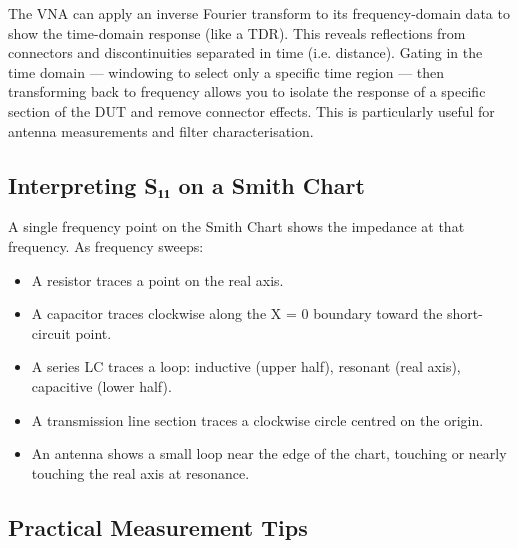       

The VNA can apply an inverse Fourier transform to its frequency-domain data to show the time-domain response (like a TDR). This reveals reflections from connectors and discontinuities separated in time (i.e. distance). Gating in the time domain — windowing to select only a specific time region — then transforming back to frequency allows you to isolate the response of a specific section of the DUT and remove connector effects. This is particularly useful for antenna measurements and filter characterisation.

      

\subsection{Interpreting S₁₁ on a Smith Chart}

      

A single frequency point on the Smith Chart shows the impedance at that frequency. As frequency sweeps:

      
\begin{itemize}

        \item A resistor traces a point on the real axis.

        \item A capacitor traces clockwise along the X = 0 boundary toward the short-circuit point.

        \item A series LC traces a loop: inductive (upper half), resonant (real axis), capacitive (lower half).

        \item A transmission line section traces a clockwise circle centred on the origin.

        \item An antenna shows a small loop near the edge of the chart, touching or nearly touching the real axis at resonance.

      
\end{itemize}

      

\subsection{Practical Measurement Tips}

